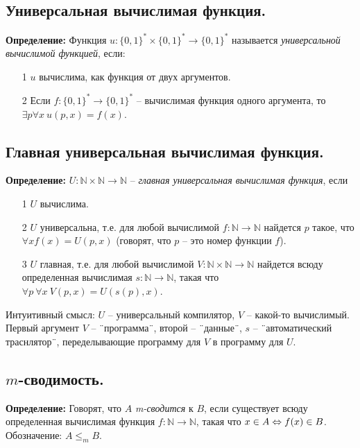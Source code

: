 \subsection{Универсальная вычислимая функция.}

\textbf{Определение: } Функция $u:\{0,1\}^* \times \{0,1\}^* \rightarrow \{0,1\}^*$ называется \textit{универсальной вычислимой функцией}, если:
\begin{itemize}
    \item[1] $u$ вычислима, как функция от двух аргументов.
    \item[2] Если $f:\{0,1\}^* \rightarrow \{0,1\}^* $ -- вычислимая функция одного аргумента, то $\exists p \forall x \ u(p,x) = f(x)$.
\end{itemize}

\subsection{Главная универсальная вычислимая функция.}

\textbf{Определение: } $U:\mathbb{N}\times\mathbb{N} \rightarrow \mathbb{N}$ -- \textit{главная универсальная вычислимая функция}, если
\begin{itemize}
    \item[1] $U$ вычислима.
    \item[2] $U$ универсальна, т.е. для любой вычислимой $f:\mathbb{N} \rightarrow \mathbb{N} $ найдется $p$ такое, что $\forall x f(x) = U(p,x)$ (говорят, что $p$ -- это номер функции $f$).
    \item[3] $U$ главная, т.е. для любой вычислимой $V: \mathbb{N}\times\mathbb{N} \rightarrow \mathbb{N}$ найдется всюду определенная вычислимая $s:\mathbb{N} \rightarrow \mathbb{N}$, такая что $\forall p \ \forall x \ V(p,x) = U(s(p),x)$.
\end{itemize}
Интуитивный смысл: $U$ -- универсальный компилятор, $V$ -- какой-то вычислимый. Первый аргумент $V$ -- \" \ программа\" \ , второй -- \" \ данные\" \ , $s$ -- \" \ автоматический траснлятор\" \ , переделывающие программу для $V$ в программу для $U$.

\subsection{$m$-сводимость.}

\textbf{Определение: } Говорят, что $A$ \textit{m-сводится} к $B$, если существует всюду определенная вычислимая функция $f:\mathbb{N} \rightarrow \mathbb{N}$, такая что $x \in A \Leftrightarrow f(x) \in B$. Обозначение: $A\leq_m B$.

